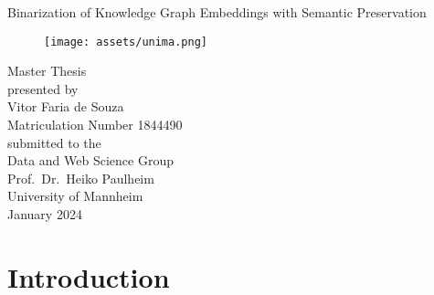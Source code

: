 \documentclass[11pt,titlepage,oneside,openany]{book}
\begin{document}

\begin{titlepage}
  \begin{center}
   {\Large Binarization of Knowledge Graph Embeddings with Semantic Preservation\\}
   \vspace{2cm}
   \begin{figure}[h!]
	\begin{center}
	\texttt{[image: assets/unima.png]}
	\label{fig:unima}
	\end{center}
    \end{figure}
   {Master Thesis\\}
   \vspace{2cm}
   {presented by\\
    Vitor Faria de Souza \\
    Matriculation Number 1844490\\
   }
   \vspace{1cm}
   {submitted to the\\
    Data and Web Science Group\\
    Prof.\ Dr.\ Heiko Paulheim\\
    University of Mannheim\\} \vspace{2cm}
   {January 2024}
  \end{center}
\end{titlepage}

\tableofcontents
\newpage


\listoffigures

\listoftables


\newpage



\chapter{Introduction}
\label{cha:intro}
\end{document}

